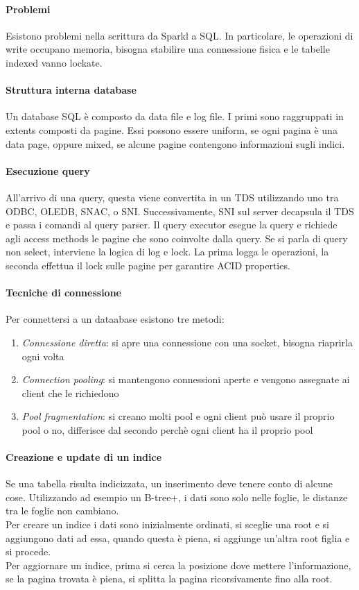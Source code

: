\paragraph{Problemi}
Esistono problemi nella scrittura da Sparkl a SQL. In particolare, le operazioni di 
write occupano memoria, bisogna stabilire una connessione fisica e le tabelle indexed 
vanno lockate.

\paragraph{Struttura interna database}
Un database SQL è composto da data file e log file. I primi sono raggruppati in extents 
composti da pagine. Essi possono essere uniform, se ogni pagina è una data page, oppure 
mixed, se alcune pagine contengono informazioni sugli indici.

\paragraph{Esecuzione query}
All'arrivo di una query, questa viene convertita in un TDS utilizzando uno tra ODBC, 
OLEDB, SNAC, o SNI.
Successivamente, SNI sul server decapsula il TDS e passa i comandi al query parser.
Il query executor esegue la query e richiede agli access methods le pagine che sono 
coinvolte dalla query. Se si parla di query non select, interviene la logica di log e lock.
La prima logga le operazioni, la seconda effettua il lock sulle pagine per garantire ACID properties.

\paragraph{Tecniche di connessione}
Per connettersi a un dataabase esistono tre metodi:
\begin{enumerate}
    \item \emph{Connessione diretta}: si apre una connessione con una socket, bisogna 
    riaprirla ogni volta
    \item \emph{Connection pooling}: si mantengono connessioni aperte e vengono assegnate 
    ai client che le richiedono
    \item \emph{Pool fragmentation}: si creano molti pool e ogni client può usare il proprio
     pool o no, differisce dal secondo perchè ogni client ha il proprio pool
\end{enumerate}

\paragraph{Creazione e update di un indice}
Se una tabella risulta indicizzata, un inserimento deve tenere conto 
di alcune cose.
Utilizzando ad esempio un B-tree+, i dati sono solo nelle foglie, le distanze tra le 
foglie non cambiano.\\
Per creare un indice i dati sono inizialmente ordinati, si sceglie una root e si 
aggiungono dati ad essa, quando questa è piena, si aggiunge un'altra root figlia e si procede.\\
Per aggiornare un indice, prima si cerca la posizione dove mettere l'informazione, 
se la pagina trovata è piena, si splitta la pagina ricorsivamente fino alla root.

